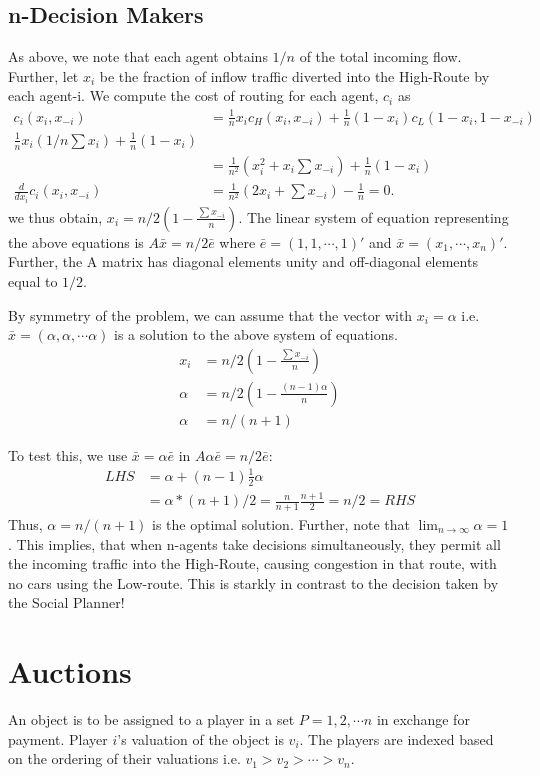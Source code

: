 \documentclass[11pt]{article}
\theoremstyle{definition}
\begin{document}
\subsection{n-Decision Makers}
As above, we note that each agent obtains $1/n$ of the total incoming flow. Further, let $x_i$ be the fraction of inflow traffic diverted into the High-Route by each agent-i. We compute the cost of routing for each agent, $c_i$ as
\begin{align*}
c_i(x_i,x_{-i}) &= \frac{1}{n}x_i c_H(x_i, x_{-i}) + \frac{1}{n}(1-x_i)c_L(1-x_i, 1-x_{-i})\\
\frac{1}{n}x_i (1/n \sum x_i) + \frac{1}{n}(1-x_i)\\
&= \frac{1}{n^2}(x_i^2 + x_i\sum x_{-i})+ \frac{1}{n}(1-x_i)\\
\frac{d}{dx_i}c_i(x_i,x_{-i}) &= \frac{1}{n^2}(2x_i + \sum x_{-i}) - \frac{1}{n} = 0.
\end{align*}
we thus obtain, $x_i = n/2(1 - \frac{\sum x_{-i}}{n})$. The linear system of equation representing the above equations is $A\bar{x}=n/2\bar{e}$ where $\bar{e} = (1,1,\cdots, 1)'$ and $\bar{x}= (x_1, \cdots, x_n)'$. Further, the A matrix has diagonal elements unity and off-diagonal elements equal to $1/2$.

By symmetry of the problem, we can assume that the vector with $x_i = \alpha$ i.e. $\bar{x}=(\alpha, \alpha, \cdots \alpha)$ is a solution to the above system of equations. 
\begin{align*}
x_i &= n/2(1 - \frac{\sum x_{-i}}{n})\\
\alpha &= n/2(1 - \frac{(n-1)\alpha}{n})\\
\alpha &= n/(n+1)
\end{align*}

To test this, we use $\bar{x} = \alpha \bar{e}$ in $A \alpha \bar{e} = n/2\bar{e}$:
\begin{align*}
LHS &= \alpha + (n-1)\frac{1}{2}\alpha\\
&=\alpha*(n+1)/2 =\frac{n}{n+1}\frac{n+1}{2} = n/2 = RHS
\end{align*}
Thus, $\alpha = n/(n+1)$ is the optimal solution. Further, note that $\lim_{n\rightarrow \infty} \alpha = 1$.
This implies, that when n-agents take decisions simultaneously, they permit all the incoming traffic into the High-Route, causing congestion in that route, with no cars using the Low-route. This is starkly in contrast to the decision taken by the Social Planner!

\section{Auctions}
An object is to be assigned to a player in a set $P = {1,2, \cdots n}$ in exchange for payment. Player $i$'s valuation of the object is $v_i$. The players are indexed based on the ordering of their valuations i.e. $v_1 > v_2 >\cdots > v_n$.
\end{document}

